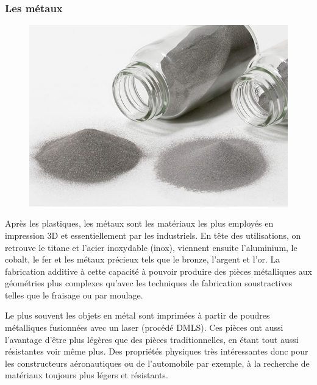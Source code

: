 \documentclass{article}
\begin{document}
\subsubsection{Les métaux}
\begin{figure}[h!]
\centering
\includegraphics[scale=0.4]{./images/poudre-metallique.png}
\end{figure}\hfill
 \par\leavevmode\par
Après les plastiques, les métaux sont les matériaux les plus employés en impression 3D et essentiellement par les industriels. En tête des utilisations, on retrouve le titane et l'acier inoxydable (inox), viennent ensuite l'aluminium, le cobalt, le fer et les métaux précieux tels que le bronze, l'argent et l'or. La fabrication additive à cette capacité à pouvoir produire des pièces métalliques aux géométries plus complexes qu'avec les techniques de fabrication soustractives telles que le fraisage ou par moulage.\hfill
 \par\leavevmode\par
Le plus souvent les objets en métal sont imprimées à partir de poudres métalliques fusionnées avec un laser (procédé DMLS). Ces pièces ont aussi l'avantage d'être plus légères que des pièces traditionnelles, en étant tout aussi résistantes voir même plus. Des propriétés physiques très intéressantes donc pour les constructeurs aéronautiques ou de l'automobile par exemple, à la recherche de matériaux toujours plus légers et résistants.
\newpage
\end{document}
